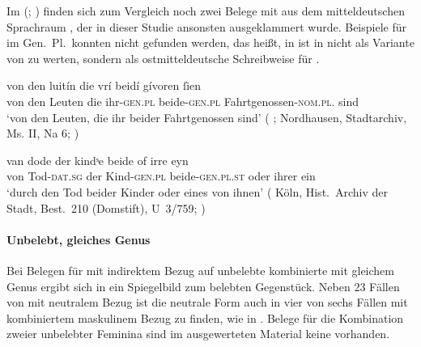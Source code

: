 Im  (\REM; \nosh\cite{rem}) finden sich
zum Vergleich noch zwei Belege mit  aus dem
mitteldeutschen Sprachraum
, der in dieser Studie ansonsten ausgeklammert wurde.
Beispiele für  im Gen.\ Pl.\ konnten nicht gefunden werden, das
heißt,  in  ist in  nicht als Variante
von  zu werten, sondern als ostmitteldeutsche
Schreibweise für  \autocites[52--53]{paul2007}[305]{ksw2}.

\begin{exe}
\ex \label{ex:remgenbeide}
\begin{xlist}
	\ex \label{ex:remgenbeide_1}
		\gll von den luitín die vrí beidí gívoren ſien \\
			von den Leuten die ihr-\textsc{gen.pl} beide-\textsc{gen.pl}
				Fahrtgenossen-\textsc{nom.pl.\MascA} sind \\
		\trans `von den Leuten, die ihr beider Fahrtgenossen sind'
			(%
				;
				Nordhausen, Stadtarchiv, Ms. II, Na 6;
				\cite[M320: 17v,21--22]{rem}%
			)

	\ex \label{ex:remgenbeide_2}
		\gll van dode der kindˢe beide of irre eyn \\
			von Tod-\textsc{dat.sg} der Kind-\textsc{gen.pl}
				beide-\textsc{gen.pl.st} oder ihrer ein \\
		\trans `durch den Tod beider Kinder oder eines von ihnen'
			(%
				Köln, Hist.~Archiv der Stadt, Best.~210
				\mkbibparens{Domstift}, U~3/759;
				\cite[M350: 5,11]{rem}%
			)
\end{xlist}
\end{exe}

\paragraph{Unbelebt, gleiches Genus}

Bei Belegen für  mit indirektem Bezug auf unbelebte kombinierte
 mit gleichem Genus ergibt sich in
 ein Spiegelbild zum belebten
Gegenstück. Neben 23 Fällen von  mit neutralem Bezug ist die
neutrale Form auch in vier von sechs Fällen mit kombiniertem maskulinem Bezug
zu finden, wie in . Belege für die
Kombination zweier unbelebter Feminina sind im ausgewerteten Material keine
vorhanden.

